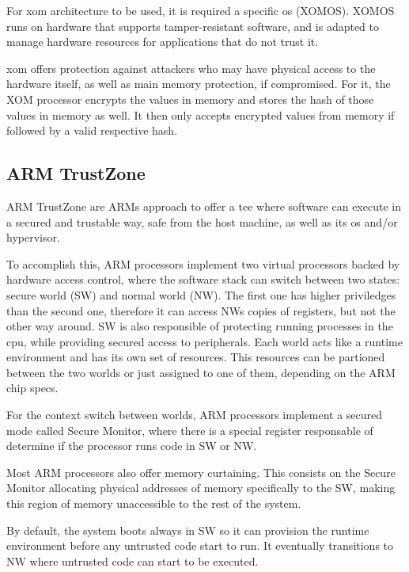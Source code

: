For \gls{xom} architecture to be used, it is required a specific \gls{os} (XOMOS). XOMOS runs on hardware that supports tamper-resistant software, and is adapted to manage hardware resources for applications that do not trust it.

\gls{xom} offers protection against attackers who may have physical access to the hardware itself, as well as main memory protection, if compromised. For it, the XOM processor encrypts the values in memory and stores the hash of those values in memory as well. It then only accepts encrypted values from memory if followed by a valid respective hash. 



\subsection{ARM TrustZone}
\label{ssec:armtz}

ARM TrustZone \cite{armTZPaper} are ARMs approach to offer a \gls{tee} where software can execute in a secured and trustable way, safe from the host machine, as well as its \gls{os} and/or hypervisor. 

To accomplish this, ARM processors implement two virtual processors backed by hardware access control, where the software stack can switch between two states: secure world (SW) and normal world (NW). 
The first one has higher priviledges than the second one, therefore it can access NWs copies of registers, but not the other way around. SW is also responsible of protecting running processes in the \gls{cpu}, while providing secured access to peripherals. 
Each world acts like a runtime environment and has its own set of resources. This resources can be partioned between the two worlds or just assigned to one of them, depending on the ARM chip specs.

For the context switch between worlds, ARM processors implement a secured mode called Secure Monitor, where there is a special register responsable of determine if the processor runs code in SW or NW. 

Most ARM processors also offer memory curtaining. This consists on the Secure Monitor allocating physical addresses of memory specifically to the SW, making this region of memory unaccessible to the rest of the system.

By default, the system boots always in SW so it can provision the runtime environment before any untrusted code start to run. It eventually transitions to NW where untrusted code can start to be executed. 

